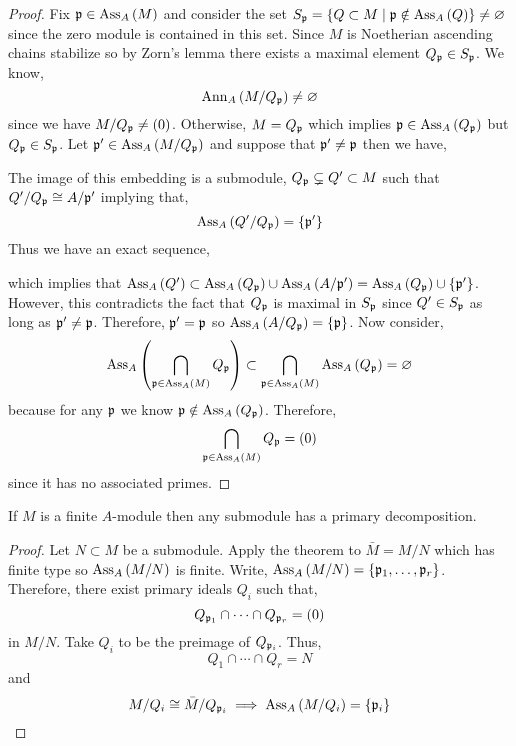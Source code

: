 \documentclass[12pt]{article}
\begin{document}
\begin{proof}
Fix $\mathfrak{p} \in \mathrm{Ass}_{A}\left( M \right)$ and consider the set $S_{\mathfrak{p}} = \{ Q \subset M \mid \mathfrak{p} \notin \mathrm{Ass}_{A}\left( Q \right) \} \neq \varnothing$ since the zero module is contained in this set. Since $M$ is Noetherian ascending chains stabilize so by Zorn's lemma there exists a maximal element $Q_{\mathfrak{p}} \in S_{\mathfrak{p}}$. We know,
\[ \mathrm{Ann}_{A}\left(M / Q_{\mathfrak{p}}\right)  \neq \varnothing \]
since we have $M / Q_{\mathfrak{p}} \neq (0)$. Otherwise, $M = Q_{\mathfrak{p}}$ which implies $\mathfrak{p} \in \mathrm{Ass}_{A}\left( Q_{\mathfrak{p}} \right)$ but $Q_{\mathfrak{p}} \in S_{\mathfrak{p}}$. Let $\mathfrak{p}' \in \mathrm{Ass}_{A}\left( M / Q_{\mathfrak{p}} \right)$ and suppose that $\mathfrak{p}' \neq \mathfrak{p}$ then we have,
\begin{center}
\end{center}    
The image of this embedding is a submodule, $Q_{\mathfrak{p}} \subsetneq Q' \subset M$ such that $Q' / Q_{\mathfrak{p}} \cong A / \mathfrak{p}'$ implying that,
\[ \mathrm{Ass}_{A}\left( Q' / Q_{\mathfrak{p}} \right) = \{ \mathfrak{p}' \} \]
Thus we have an exact sequence,
\begin{center}
\end{center}
which implies that $\mathrm{Ass}_{A}\left( Q' \right) \subset \mathrm{Ass}_{A}\left( Q_{\mathfrak{p}} \right) \cup \mathrm{Ass}_{A}\left( A / \mathfrak{p}' \right) =  \mathrm{Ass}_{A}\left( Q_{\mathfrak{p}} \right) \cup \{ \mathfrak{p}' \}$.
However, this contradicts the fact that $Q_{\mathfrak{p}}$ is maximal in $S_{\mathfrak{p}}$ since $Q' \in S_{\mathfrak{p}}$ as long as $\mathfrak{p}' \neq \mathfrak{p}$. Therefore, $\mathfrak{p}' = \mathfrak{p}$ so $\mathrm{Ass}_{A}\left( A / Q_{\mathfrak{p}} \right) = \{ \mathfrak{p} \}$. Now consider,
\[ \mathrm{Ass}_{A}\left( \bigcap_{\mathfrak{p} \in \mathrm{Ass}_{A}\left( M \right)} Q_{\mathfrak{p}} \right) \subset \bigcap_{\mathfrak{p} \in \mathrm{Ass}_{A}\left( M \right)} \mathrm{Ass}_{A}\left( Q_{\mathfrak{p}} \right) = \varnothing \]
because for any $\mathfrak{p}$ we know $\mathfrak{p} \notin \mathrm{Ass}_{A}\left( Q_{\mathfrak{p}} \right)$. Therefore,
\[ \bigcap_{\mathfrak{p} \in \mathrm{Ass}_{A}\left( M \right)} Q_{\mathfrak{p}} = (0) \]
since it has no associated primes. 
\end{proof}

\begin{corollary}
If $M$ is a finite $A$-module then any submodule has a primary decomposition. 
\end{corollary}

\begin{proof}
Let $N \subset M$ be a submodule. 
Apply the theorem to $\bar{M} = M / N$ which has finite type so $\mathrm{Ass}_{A}\left( M / N \right)$ is finite. Write, $\mathrm{Ass}_{A}\left( M / N \right) = \{ \mathfrak{p}_1, \dots, \mathfrak{p}_r \}$. Therefore, there exist primary ideals $Q_i$ such that,
\[ Q_{\mathfrak{p}_1} \cap \cdots \cap Q_{\mathfrak{p}_r} = (0) \]
in $M / N$. Take $Q_i$ to be the preimage of $Q_{\mathfrak{p}_i}$. Thus,
\[ Q_1 \cap \cdots \cap Q_r = N \]
and 
\[ M / Q_i \cong \bar{M} / Q_{\mathfrak{p}_i} \implies \mathrm{Ass}_{A}\left( M / Q_i \right) = \{ \mathfrak{p}_i \} \]
\end{proof}
\end{document}
